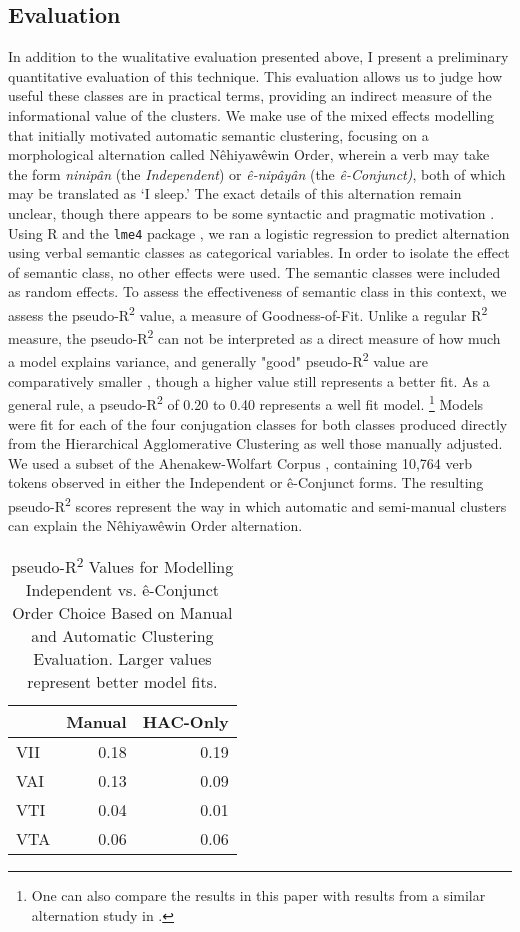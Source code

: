 \subsection{Evaluation}
 In addition to the wualitative evaluation presented above, I present a preliminary quantitative evaluation of this technique. This evaluation allows us to judge how useful these classes are in practical terms, providing an indirect measure of the informational value of the clusters. We make use of the mixed effects modelling that initially motivated automatic semantic clustering, focusing on a morphological alternation called Nêhiyawêwin Order, wherein a verb may take the form \textit{ninipân} (the \textit{Independent}) or \textit{ê-nipâyân} (the \textit{ê-Conjunct)}, both of which may be translated as `I sleep.' The exact details of this alternation remain unclear, though there appears to be some syntactic and pragmatic motivation \citep{Cook2014}. Using R \citep{R} and the \texttt{lme4} package \citep{lme4}, we ran a logistic regression to predict alternation using verbal semantic classes as categorical variables. In order to isolate the effect of semantic class, no other effects were used. The semantic classes were included as random effects. To assess the effectiveness of semantic class in this context, we assess the pseudo-R\textsuperscript{2} value, a measure of Goodness-of-Fit. Unlike a regular R\textsuperscript{2} measure, the pseudo-R\textsuperscript{2} can not be interpreted as a direct measure of how much a model explains variance, and generally "good" pseudo-R\textsuperscript{2} value are comparatively smaller \citep{mcfadden1973conditional}, though a higher value still represents a better fit. As a general rule, a pseudo-R\textsuperscript{2} of 0.20 to 0.40 represents a well fit model. \citep{pseudor2}\footnote{One can also compare the results in this paper with results from a similar alternation study in \citet{arppe2008univariate}.} Models were fit for each of the four conjugation classes for both classes produced directly from the Hierarchical Agglomerative Clustering as well those manually adjusted. We used a subset of the Ahenakew-Wolfart Corpus \citep{arppe1945morphosyntactically}, containing 10,764 verb tokens observed in either the Independent or ê-Conjunct forms. The resulting pseudo-R\textsuperscript{2} scores represent the way in which automatic and semi-manual clusters can explain the Nêhiyawêwin Order alternation. 

\begin{table}[]
\centering
\begin{tabular}{lrr}
\toprule
    & \textbf{Manual} & \textbf{HAC-Only} \\
    \midrule
VII & 0.18   & 0.19 \\
VAI & 0.13   & 0.09 \\
VTI & 0.04   & 0.01  \\
VTA & 0.06   & 0.06  \\
\bottomrule
\end{tabular}
\caption{pseudo-R\textsuperscript{2} Values for Modelling Independent vs. ê-Conjunct Order Choice Based on Manual and Automatic Clustering Evaluation. Larger values represent better model fits.}
\label{tab4}
\centering
\end{table}


